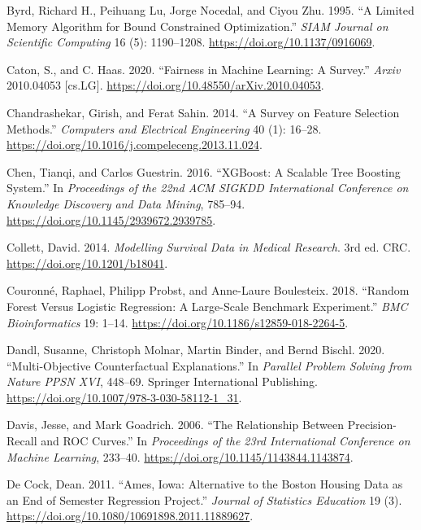 \begin{CSLReferences}{1}{0}
\leavevmode{}%
Byrd, Richard H., Peihuang Lu, Jorge Nocedal, and Ciyou Zhu. 1995. {``A
Limited Memory Algorithm for Bound Constrained Optimization.''}
\emph{SIAM Journal on Scientific Computing} 16 (5): 1190--1208.
\url{https://doi.org/10.1137/0916069}.

\leavevmode{}%
Caton, S., and C. Haas. 2020. {``Fairness in Machine Learning: A
Survey.''} \emph{Arxiv} 2010.04053 {{[}cs.LG{]}}.
\url{https://doi.org/10.48550/arXiv.2010.04053}.

\leavevmode{}%
Chandrashekar, Girish, and Ferat Sahin. 2014. {``A Survey on Feature
Selection Methods.''} \emph{Computers and Electrical Engineering} 40
(1): 16--28. \url{https://doi.org/10.1016/j.compeleceng.2013.11.024}.

\leavevmode{}%
Chen, Tianqi, and Carlos Guestrin. 2016. {``{XGB}oost: A Scalable Tree
Boosting System.''} In \emph{Proceedings of the 22nd {ACM SIGKDD}
International Conference on Knowledge Discovery and Data Mining},
785--94. \url{https://doi.org/10.1145/2939672.2939785}.

\leavevmode{}%
Collett, David. 2014. \emph{Modelling Survival Data in Medical
Research}. 3rd ed. CRC. \url{https://doi.org/10.1201/b18041}.

\leavevmode{}%
Couronné, Raphael, Philipp Probst, and Anne-Laure Boulesteix. 2018.
{``Random Forest Versus Logistic Regression: A Large-Scale Benchmark
Experiment.''} \emph{BMC Bioinformatics} 19: 1--14.
\url{https://doi.org/10.1186/s12859-018-2264-5}.

\leavevmode{}%
Dandl, Susanne, Christoph Molnar, Martin Binder, and Bernd Bischl. 2020.
{``Multi-Objective Counterfactual Explanations.''} In \emph{Parallel
Problem Solving from Nature {PPSN} {XVI}}, 448--69. Springer
International Publishing.
\url{https://doi.org/10.1007/978-3-030-58112-1_31}.

\leavevmode{}%
Davis, Jesse, and Mark Goadrich. 2006. {``The Relationship Between
Precision-Recall and ROC Curves.''} In \emph{Proceedings of the 23rd
International Conference on Machine Learning}, 233--40.
\url{https://doi.org/10.1145/1143844.1143874}.

\leavevmode{}%
De Cock, Dean. 2011. {``Ames, Iowa: Alternative to the Boston Housing
Data as an End of Semester Regression Project.''} \emph{Journal of
Statistics Education} 19 (3).
\url{https://doi.org/10.1080/10691898.2011.11889627}.


\end{CSLReferences}
